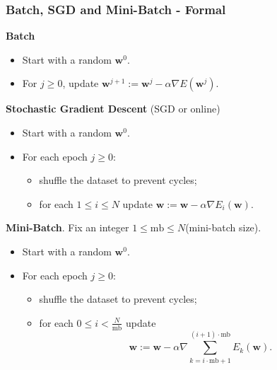 \documentclass{beamer}
\begin{document}
	\begin{frame}
		\frametitle{Batch, SGD and Mini-Batch - Formal}
		\textbf{Batch}
		\begin{itemize}
			\item Start with a random $\bm{w}^0$.
			\item For $j \geq 0$, update $\bm{w}^{j+1} := \bm{w}^{j} - \alpha \nabla E(\bm{w}^j)$.
		\end{itemize}
		
		\textbf{Stochastic Gradient Descent} (SGD or online)
		\begin{itemize}
			\item Start with a random $\bm{w}^0$.
			\item For each epoch $j \geq 0$:
			\begin{itemize}
				\item shuffle the dataset to prevent cycles;
				\item for each $1\leq i \leq N$ update $\bm{w} := \bm{w} - \alpha \nabla E_i(\bm{w})$.
			\end{itemize}
		\end{itemize}
	
		\textbf{Mini-Batch}. Fix an integer $1 \leq \text{mb} \leq N$(mini-batch size).
		\begin{itemize}
			\item Start with a random $\bm{w}^0$.
			\item For each epoch $j \geq 0$:
			\begin{itemize}
				\item shuffle the dataset to prevent cycles;
				\item for each $0 \leq i < \frac{N}{\text{mb}}$ update
				\begin{equation*}
					\bm{w} := \bm{w} - \alpha \nabla \sum_{k=i\cdot\text{mb} + 1}^{(i+1)\cdot\text{mb}}E_k(\bm{w}).
				\end{equation*}
			\end{itemize} 
		\end{itemize}
		
	\end{frame}
\end{document}
